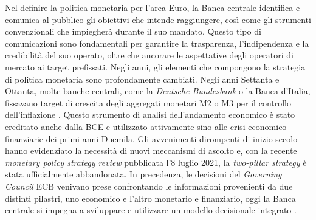 Nel definire la politica monetaria per l'area Euro, la Banca centrale identifica e comunica al pubblico gli obiettivi che intende raggiungere, così come gli strumenti convenzionali che impiegherà durante il suo mandato. Questo tipo di comunicazioni sono fondamentali per garantire la trasparenza, l'indipendenza e la credibilità del suo operato, oltre che ancorare le aspettative degli operatori di mercato ai target prefissati. Negli anni, gli elementi che compongono la strategia di politica monetaria sono profondamente cambiati. Negli anni Settanta e Ottanta, molte banche centrali, come la \textit{Deutsche Bundesbank} o la Banca d'Italia, fissavano target di crescita degli aggregati monetari M2 o M3 per il controllo dell'inflazione \parencite{DB:monetary_policy_strategies}. Questo strumento di analisi dell'andamento economico è stato ereditato anche dalla BCE e utilizzato attivamente sino alle crisi economico finanziarie dei primi anni Duemila. Gli avvenimenti dirompenti di inizio secolo hanno evidenziato la necessità di nuovi meccanismi di ascolto e, con la recente \textit{monetary policy strategy review} pubblicata l'8 luglio 2021, la \textit{two-pillar strategy} è stata ufficialmente abbandonata. In precedenza, le decisioni del \textit{Governing Council} ECB venivano prese confrontando le informazioni provenienti da due distinti pilastri, uno economico e l'altro monetario e finanziario, oggi la Banca centrale si impegna a sviluppare e utilizzare un modello decisionale integrato \parencite{ECB:overview_strategy_review}.

